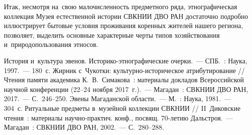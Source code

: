 Итак, несмотря на~свою малочисленность предметного ряда, этнографическая коллекция Музея естественной истории СВКНИИ ДВО РАН достаточно подробно иллюстрирует бытовые условия проживания коренных жителей нашего региона, позволяет, выделить основные характерные черты типов хозяйствования и~природопользования этносов.

\begin{thebibliography}{99}
\bibitem{}История и~культура эвенов. Историко-этнографические очерки.~--- СПБ.~: Наука, 1997.~--- 180~с.
\bibitem{} Жирник с~Чукотки: культурно-историческое атрибутирование // Чтения памяти академика К.~В.~Симакова~: материалы докладов Всероссийской научной конференции (22--24 ноября 2017~г.).~--- Магадан~: СВКНИИ ДВО РАН, 2017.~--- С.~246--250.
\bibitem{} Эвены Магаданской области.~--- М.~: Наука, 1981.~--- 304~с.
\bibitem{} Ритуальные предметы в~музейной коллекции СВКНИИ // II~Диковские чтения~: материалы научно-практич. конф., посвящ. 70-летию Дальстроя.~--- Магадан~: СВКНИИ ДВО РАН, 2002.~--- С.~280--288.

\end{thebibliography}
